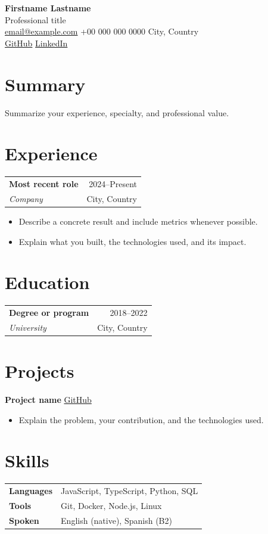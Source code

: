 \documentclass[11pt,a4paper]{article}
\makeatletter
\newcommand{\entry}[4]{%
  \begin{tabularx}{\linewidth}{@{}Xr@{}}
    \textbf{#1} & \textcolor{muted}{#2} \\
    \textit{#3} & \textcolor{muted}{#4}
  \end{tabularx}\vspace{0.25em}
}
\makeatother
\begin{document}
\begin{center}
  {\Huge\bfseries Firstname Lastname}\\[0.35em]
  {\large\color{accent}Professional title}\\[0.6em]
  \href{mailto:email@example.com}{email@example.com}
  \quad\textcolor{accent}{\textbullet}\quad +00 000 000 0000
  \quad\textcolor{accent}{\textbullet}\quad City, Country\\[0.25em]
  \href{https://github.com/username}{GitHub}
  \quad\textcolor{accent}{\textbullet}\quad
  \href{https://linkedin.com/in/username}{LinkedIn}
\end{center}

\section{Summary}
Summarize your experience, specialty, and professional value.

\section{Experience}
\entry{Most recent role}{2024--Present}{Company}{City, Country}
\begin{itemize}
  \item Describe a concrete result and include metrics whenever possible.
  \item Explain what you built, the technologies used, and its impact.
\end{itemize}

\section{Education}
\entry{Degree or program}{2018--2022}{University}{City, Country}

\section{Projects}
\textbf{Project name} \hfill \href{https://github.com/username}{GitHub}
\begin{itemize}
  \item Explain the problem, your contribution, and the technologies used.
\end{itemize}

\section{Skills}
\begin{tabularx}{\linewidth}{@{}>{\bfseries}l X@{}}
  Languages & JavaScript, TypeScript, Python, SQL \\
  Tools     & Git, Docker, Node.js, Linux \\
  Spoken    & English (native), Spanish (B2)
\end{tabularx}
\end{document}
